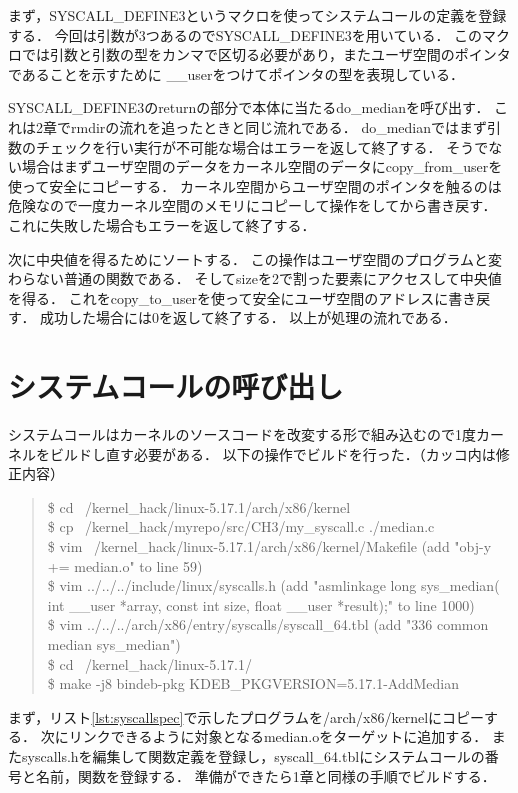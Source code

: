 まず，SYSCALL\_DEFINE3というマクロを使ってシステムコールの定義を登録する．
今回は引数が3つあるのでSYSCALL\_DEFINE3を用いている．
このマクロでは引数と引数の型をカンマで区切る必要があり，またユーザ空間のポインタであることを示すために
\_\_userをつけてポインタの型を表現している．

SYSCALL\_DEFINE3のreturnの部分で本体に当たるdo\_medianを呼び出す．
これは2章でrmdirの流れを追ったときと同じ流れである．
do\_medianではまず引数のチェックを行い実行が不可能な場合はエラーを返して終了する．
そうでない場合はまずユーザ空間のデータをカーネル空間のデータにcopy\_from\_userを使って安全にコピーする．
カーネル空間からユーザ空間のポインタを触るのは危険なので一度カーネル空間のメモリにコピーして操作をしてから書き戻す．
これに失敗した場合もエラーを返して終了する．

次に中央値を得るためにソートする．
この操作はユーザ空間のプログラムと変わらない普通の関数である．
そしてsizeを2で割った要素にアクセスして中央値を得る．
これをcopy\_to\_userを使って安全にユーザ空間のアドレスに書き戻す．
成功した場合には0を返して終了する．
以上が処理の流れである．

\section{システムコールの呼び出し}
システムコールはカーネルのソースコードを改変する形で組み込むので1度カーネルをビルドし直す必要がある．
以下の操作でビルドを行った．（カッコ内は修正内容）
\begin{quote}
\$ cd ~/kernel\_hack/linux-5.17.1/arch/x86/kernel \\
\$ cp ~/kernel\_hack/myrepo/src/CH3/my\_syscall.c  ./median.c \\
\$ vim ~/kernel\_hack/linux-5.17.1/arch/x86/kernel/Makefile (add "obj-y           += median.o" to line 59) \\
\$ vim ../../../include/linux/syscalls.h (add "asmlinkage long sys\_median( int \_\_user *array, const int size, float \_\_user *result);" to line 1000) \\
\$ vim ../../../arch/x86/entry/syscalls/syscall\_64.tbl (add "336 common  median         sys\_median") \\
\$ cd ~/kernel\_hack/linux-5.17.1/ \\
\$ make -j8 bindeb-pkg  KDEB\_PKGVERSION=5.17.1-AddMedian
\end{quote}

まず，リスト\ref{lst:syscallspec}で示したプログラムを/arch/x86/kernelにコピーする．
次にリンクできるように対象となるmedian.oをターゲットに追加する．
またsyscalls.hを編集して関数定義を登録し，syscall\_64.tblにシステムコールの番号と名前，関数を登録する．
準備ができたら1章と同様の手順でビルドする．

